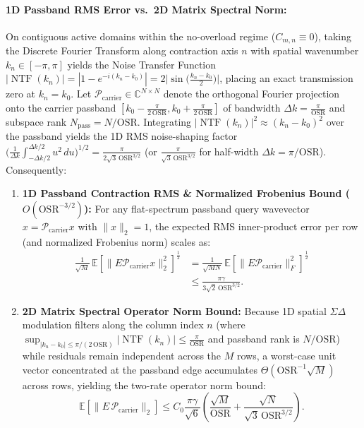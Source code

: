 \documentclass[10pt, twocolumn, a4paper]{article}
\begin{document}
\paragraph{1D Passband RMS Error vs.\ 2D Matrix Spectral Norm:}
On contiguous active domains within the no-overload regime ($C_{m,n} \equiv 0$), taking the Discrete Fourier Transform along contraction axis $n$ with spatial wavenumber $k_n \in [-\pi, \pi]$ yields the Noise Transfer Function $|\operatorname{NTF}(k_n)| = |1 - e^{-i(k_n - k_0)}| = 2\big|\sin\!\big(\frac{k_n - k_0}{2}\big)\big|$, placing an exact transmission zero at $k_n = k_0$. Let $\mathcal{P}_{\text{carrier}} \in \mathbb{C}^{N \times N}$ denote the orthogonal Fourier projection onto the carrier passband $[k_0 - \frac{\pi}{2\,\text{OSR}}, k_0 + \frac{\pi}{2\,\text{OSR}}]$ of bandwidth $\Delta k = \frac{\pi}{\text{OSR}}$ and subspace rank $N_{\text{pass}} = N / \text{OSR}$. Integrating $|\operatorname{NTF}(k_n)|^2 \approx (k_n - k_0)^2$ over the passband yields the 1D RMS noise-shaping factor $\big(\frac{1}{\Delta k}\int_{-\Delta k/2}^{\Delta k/2} u^2 \, du\big)^{1/2} = \frac{\pi}{2\sqrt{3}\,\text{OSR}^{3/2}}$ (or $\frac{\pi}{\sqrt{3}\,\text{OSR}^{3/2}}$ for half-width $\Delta k = \pi/\text{OSR}$). Consequently:
\begin{enumerate}
    \item \textbf{1D Passband Contraction RMS \& Normalized Frobenius Bound ($O(\text{OSR}^{-3/2})$):} For any flat-spectrum passband query wavevector $x = \mathcal{P}_{\text{carrier}} x$ with $\|x\|_2 = 1$, the expected RMS inner-product error per row (and normalized Frobenius norm) scales as:
    \begin{equation}
    \begin{split}
    \frac{1}{\sqrt{M}}\,\mathbb{E}\!\left[\|E \mathcal{P}_{\text{carrier}} x\|_2^2\right]^{\frac{1}{2}}
    &= \frac{1}{\sqrt{MN}}\,\mathbb{E}\!\left[\|E \mathcal{P}_{\text{carrier}}\|_F^2\right]^{\frac{1}{2}} \\
    &\le \frac{\pi \gamma}{3\sqrt{2} \, \text{OSR}^{3/2}}.
    \end{split}
    \label{eq:passband_frob}
    \end{equation}
    \item \textbf{2D Matrix Spectral Operator Norm Bound:} Because 1D spatial $\Sigma\Delta$ modulation filters along the column index $n$ (where $\sup_{|k_n - k_0| \le \pi/(2\,\text{OSR})} |\operatorname{NTF}(k_n)| \le \frac{\pi}{\text{OSR}}$ and passband rank is $N/\text{OSR}$) while residuals remain independent across the $M$ rows, a worst-case unit vector concentrated at the passband edge accumulates $\Theta(\text{OSR}^{-1}\sqrt{M})$ across rows, yielding the two-rate operator norm bound:
    \begin{equation}
    \mathbb{E}\!\left[\|E \, \mathcal{P}_{\text{carrier}}\|_2\right] \le C_0 \frac{\pi \gamma}{\sqrt{6}} \left( \frac{\sqrt{M}}{\text{OSR}} + \frac{\sqrt{N}}{\sqrt{3} \, \text{OSR}^{3/2}} \right).
    \label{eq:passband_opnorm}
    \end{equation}
\end{enumerate}
\end{document}
